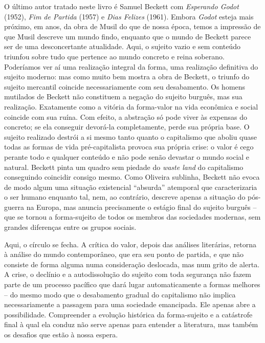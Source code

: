 O último autor tratado neste livro é Samuel Beckett com \emph{Esperando
Godot} (1952), \emph{Fim de Partida} (1957) e \emph{Dias Felizes}
(1961). Embora \emph{Godot} esteja mais próximo, em anos, da obra de
Musil do que de nossa época, temos a impressão de que Musil descreve um
mundo findo, enquanto que o mundo de Beckett parece ser de uma
desconcertante atualidade. Aqui, o sujeito vazio e sem conteúdo triunfou
sobre tudo que pertence ao mundo concreto e reina soberano. Poderíamos
ver aí uma realização integral da forma, uma realização definitiva do
sujeito moderno: mas como muito bem mostra a obra de Beckett, o triunfo
do sujeito mercantil coincide necessariamente com seu desabamento. Os
homens mutilados de Beckett não constituem a negação do sujeito burguês,
mas sua realização. Exatamente como a vitória da forma-valor na vida
econômica e social coincide com sua ruína. Com efeito, a abstração só
pode viver às expensas do concreto; se ela conseguir devorá-la
completamente, perde sua própria base. O sujeito realizado destrói a si
mesmo tanto quanto o capitalismo que aboliu quase todas as formas de
vida pré-capitalista provoca sua própria crise: o valor é cego perante
todo e qualquer conteúdo e não pode senão devastar o mundo social e
natural. Beckett pinta um quadro sem piedade do \emph{waste land} do
capitalismo conseguindo coincidir consigo mesmo. Como Oliveira sublinha,
Beckett não evoca de modo algum uma situação existencial ``absurda''
atemporal que caracterizaria o ser humano enquanto tal, nem, ao
contrário, descreve apenas a situação do pós-guerra na Europa, mas
anuncia precisamente o estágio final do sujeito burguês -- que se tornou
a forma-sujeito de todos os membros das sociedades modernas, sem grandes
diferenças entre os grupos sociais.

Aqui, o círculo se fecha. A crítica do valor, depois das análises
literárias, retorna à análise do mundo contemporâneo, que era seu ponto
de partida, e que não consiste de forma alguma numa consideração
deslocada, mas num grito de alerta. A crise, o declínio e a
autodissolução do sujeito com toda segurança não fazem parte de um
processo pacífico que dará lugar automaticamente a formas melhores -- do
mesmo modo que o desabamento gradual do capitalismo não implica
necessariamente a passagem para uma sociedade emancipada. Ele apenas
abre a possibilidade. Compreender a evolução histórica da forma-sujeito
e a catástrofe final à qual ela conduz não serve apenas para entender a
literatura, mas também os desafios que estão à nossa espera.

